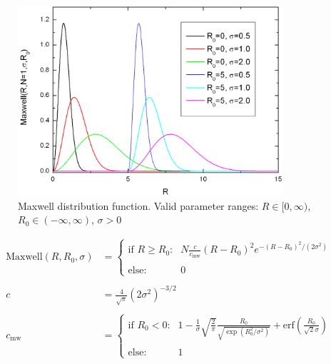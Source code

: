 \begin{figure}[htb]
\begin{center}
\includegraphics[width=0.874\textwidth]{Maxwell.png}
\end{center}
\caption{Maxwell distribution function. Valid parameter ranges: $R
\in [0,\infty)$, $R_0\in (-\infty,\infty)$, $\sigma > 0$}
\label{fig:Maxwell}
\end{figure}
\begin{subequations}
\begin{align}
\text{Maxwell}(R,R_0,\sigma) &=
\begin{cases}
\text{if $R \geq R_0$:} &
N \frac{c}{c_\text{mw}} \left(R-R_0\right)^2 e^{-\left(R-R_0\right)^2/(2\sigma^2)}\\
& \\
\text{else:} & 0
\end{cases} \\
& \nonumber \\
c &= \frac{4}{\sqrt{\pi}} \left(2\sigma^2\right)^{-3/2}  \\
& \nonumber \\
c_\text{mw} &=
\begin{cases}
\text{if $R_0 < 0$:} & 1-\frac{1}{\sigma} \sqrt{\frac{2}{\pi}}
\frac{R_0}{\sqrt{\exp\left(R_0^2/\sigma^2\right)}} +
                  \text{erf}\left(\frac{R_0}{\sqrt{2}\sigma}\right)  \\
                  & \\
\text{else:} & 1
\end{cases}
\end{align}
\end{subequations}


